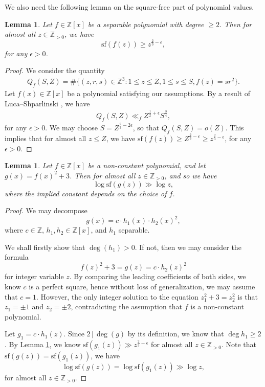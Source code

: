 \documentclass[reqno, 11pt, twoside]{amsart}
\numberwithin{equation}{section}
\newtheorem{lemma}[theorem]{Lemma}
\theoremstyle{definition}
\renewcommand{\leq}{\leqslant}
\renewcommand{\geq}{\geqslant}
\newcommand{\sqf}{\mathrm{sf}}
\newcommand{\ZZ}{\mathbb{Z}}
\begin{document}
We also need the following lemma on the square-free part of polynomial values.
\begin{lemma}\label{lemma-LS}
	Let $f \in \ZZ[x]$ be a separable polynomial with degree $\geq 2$. Then for almost all $z \in \ZZ_{>0}$, we have
	\begin{equation*}
		\sqf(f(z)) \geq z^{\frac{2}{3} - \epsilon},
	\end{equation*}
	for any $\epsilon > 0$.
\end{lemma}
\begin{proof}
    We consider the quantity 
    \begin{eqnarray*}
    	Q_f(S,Z) = \#\{ (z,r,s) \in \ZZ^3: 1 \leq z \leq Z, 1 \leq s \leq S, f(z) = sr^2 \}.
    \end{eqnarray*}
	Let $f(x) \in \ZZ[x]$ be a polynomial satisfying our assumptions. By a result of Luca--Shparlinski \cite[Theorem 1.3]{LS}, we have
	\begin{eqnarray*}
		Q_f(S,Z) \ll_f Z^{\frac{1}{2} + \epsilon}S^{\frac{3}{4}},
	\end{eqnarray*}
	for any $\epsilon > 0$.
	We may choose $S = Z^{\frac{2}{3} - 2\epsilon}$, so that
	$Q_f(S, Z) = o(Z)$. This implies that for almost all $z \leq Z$, we have $\sqf(f(z)) \geq Z^{\frac{2}{3} - \epsilon} \geq z^{\frac{2}{3}-\epsilon}$, for any $\epsilon > 0$.
\end{proof}


\begin{lemma}\label{lemma-sf}
	Let $f \in \ZZ[x]$ be a non-constant polynomial, and let $g(x) = f(x)^2 + 3$. Then for almost all $z \in \ZZ_{>0}$, and so we have
	$$\log \sqf(g(z)) \gg \log z,$$
	where the implied constant depends on the choice of $f$.
\end{lemma}
\begin{proof}
	We may decompose 
	$$g(x) = c \cdot h_1(x) \cdot h_2(x)^2,$$
	where $c \in \ZZ$, $h_1, h_2 \in \ZZ[x]$, and $h_1$ separable.
	
	We shall firstly show that $\deg(h_1) > 0$.
   If not, then we may consider the formula
   $$f(z)^2 + 3 = g(z) = c \cdot h_2(z)^2$$
   for integer variable $z$.
   By comparing the leading coefficients of both sides, we know $c$ is a perfect square, hence without loss of generalization, we may assume that $c = 1$. However, the only integer solution to the equation $z_1^2+3 = z_2^2$ is that $z_1 = \pm 1$ and $z_2 = \pm 2$, contradicting the assumption that $f$ is a non-constant polynomial.
   
   Let $g_1 = c \cdot h_1(z)$. Since $2 \, | \, \deg(g)$ by its definition, we know that  $\deg h_1 \geq 2$. 
   By Lemma \ref{lemma-LS}, we know $\sqf(g_1(z)) \gg z^{\frac{2}{3} - \epsilon}$ for almost all $z \in \ZZ_{> 0}$. Note that $\sqf(g(z)) = \sqf(g_1(z))$, we have
   \begin{equation*}
   	\log \sqf (g(z)) = \log \sqf (g_1(z)) \gg \log z,
   \end{equation*}  
   for almost all $z \in \ZZ_{>0}$.
\end{proof}
\end{document}
